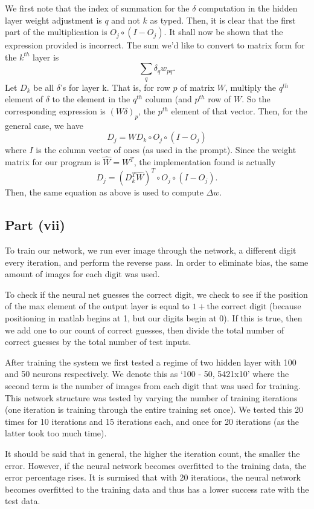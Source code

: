 \documentclass[12pt]{article}
\begin{document}
We first note that the index of summation for the $\delta$ computation in the hidden layer weight adjustment is $q$ and not $k$ as typed.
Then, it is clear that the first part of the multiplication is $O_j\circ (I-O_j)$.
It shall now be shown that the expression provided is incorrect.
The sum we'd like to convert to matrix form for the $k^{th}$ layer is 
\[\sum_{q}\delta_q w_{pq}.\]
Let $D_k$ be all $\delta$'s for layer k.
That is, for row $p$ of matrix $W$, multiply the $q^{th}$ element of $\delta$ to the element in the $q^{th}$ column (and $p^{th}$ row of $W$.
So the corresponding expression is $(W\delta)_p$, the $p^{th}$ element of that vector.
Then, for the general case, we have \[D_j = WD_k \circ O_j\circ (I-O_j)\]
where $I$ is the column vector of ones (as used in the prompt).
Since the weight matrix for our program is $\hat W =W^T$, the implementation found is actually 
\[D_j = (D_k^T\hat W)^T\circ O_j\circ (I-O_j).\]
Then, the same equation as above is used to compute \(\Delta w\).

\subsection*{Part (vii)}
To train our network, we run ever image through the network, a different digit every iteration, and perform the reverse pass.
In order to eliminate bias, the same amount of images for each digit was used.

To check if the neural net guesses the correct digit, we check to see if the position of the max element of the output layer is equal to $1+\text{the correct digit}$ (because positioning in matlab begins at 1, but our digits begin at 0). 
If this is true, then we add one to our count of correct guesses, then divide the total number of correct guesses by the total number of test inputs.

After training the system we first tested a regime of two hidden layer with 100 and 50 neurons respectively. 
We denote this as `100 - 50, 5421x10' where the second term is the number of images from each digit that was used for training.
This network structure was tested by varying the number of training iterations (one iteration is training through the entire training set once). 
We tested this 20 times for 10 iterations and 15 iterations each, and once for 20 iterations (as the latter took too much time).

It should be said that in general, the higher the iteration count, the smaller the error.
However, if the neural network becomes overfitted to the training data, the error percentage rises.
It is surmised that with 20 iterations, the neural network becomes overfitted to the training data and thus has a lower success rate with the test data. 
\end{document}
